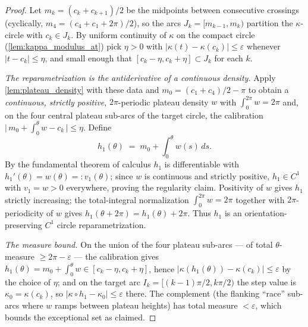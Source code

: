 \begin{proof}
  \leanok
  Let $m_k = (c_k + c_{k+1})/2$ be the midpoints between consecutive crossings
  (cyclically, $m_4 = (c_4 + c_1 + 2\pi)/2$), so the arcs $J_k = [m_{k-1}, m_k)$
  partition the $\kappa$-circle with $c_k \in J_k$. By uniform continuity of
  $\kappa$ on the compact circle (\cref{lem:kappa_modulus_at}) pick $\eta>0$ with
  $\lvert\kappa(t)-\kappa(c_k)\rvert \le \varepsilon$ whenever
  $\lvert t - c_k\rvert \le \eta$, and small enough that
  $[c_k-\eta, c_k+\eta] \subset J_k$ for each $k$.

  \emph{The reparametrization is the antiderivative of a continuous density.}
  Apply \cref{lem:plateau_density} with these data and $m_0=(c_1+c_4)/2-\pi$ to
  obtain a \emph{continuous, strictly positive}, $2\pi$-periodic plateau density
  $w$ with $\int_0^{2\pi} w = 2\pi$ and, on the four central plateau sub-arcs of
  the target circle, the calibration
  $\bigl\lvert\, m_0 + \int_0^\theta w - c_k \,\bigr\rvert \le \eta$. Define
  \[
    h_1(\theta) \;=\; m_0 + \int_0^\theta w(s)\,ds .
  \]
  By the fundamental theorem of calculus $h_1$ is differentiable with
  $h_1'(\theta)=w(\theta)=:v_1(\theta)$; since $w$ is continuous and strictly
  positive, $h_1\in C^1$ with $v_1=w>0$ everywhere, proving the regularity claim.
  Positivity of $w$ gives $h_1$ strictly increasing; the total-integral
  normalization $\int_0^{2\pi}w=2\pi$ together with $2\pi$-periodicity of $w$ gives
  $h_1(\theta+2\pi)=h_1(\theta)+2\pi$. Thus $h_1$ is an orientation-preserving
  $C^1$ circle reparametrization.

  \emph{The measure bound.} On the union of the four plateau sub-arcs --- of total
  $\theta$-measure $\ge 2\pi-\varepsilon$ --- the calibration gives
  $h_1(\theta)=m_0+\int_0^\theta w \in [c_k-\eta, c_k+\eta]$, hence
  $\lvert\kappa(h_1(\theta)) - \kappa(c_k)\rvert \le \varepsilon$ by the choice of
  $\eta$; and on the target arc $I_k=[(k-1)\pi/2,k\pi/2)$ the step value is
  $\kappa_0=\kappa(c_k)$, so $\lvert\kappa\circ h_1 - \kappa_0\rvert \le \varepsilon$
  there. The complement (the flanking ``race'' sub-arcs where $w$ ramps between
  plateau heights) has total measure $<\varepsilon$, which bounds the exceptional
  set as claimed.
\end{proof}
